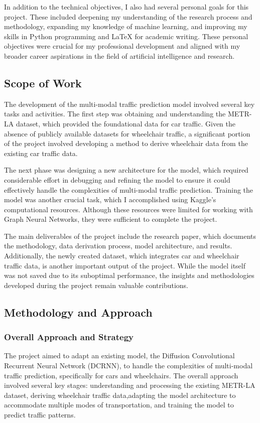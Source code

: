 In addition to the technical objectives, I also had several personal goals for this project.
These included deepening my understanding of the research process and methodology, expanding my knowledge of machine
learning, and improving my skills in Python programming and LaTeX for academic writing.
These personal objectives were crucial for my professional development and aligned with my broader career aspirations in
the field of artificial intelligence and research.

\subsection{Scope of Work}\label{subsec:scope-of-work}
The development of the multi-modal traffic prediction model involved several key tasks and activities.
The first step was obtaining and understanding the METR-LA dataset, which provided the foundational data for car
traffic.
Given the absence of publicly available datasets for wheelchair traffic, a significant portion of the project involved
developing a method to derive wheelchair data from the existing car traffic data.

The next phase was designing a new architecture for the model, which required considerable effort in debugging and
refining the model to ensure it could effectively handle the complexities of multi-modal traffic prediction.
Training the model was another crucial task, which I accomplished using Kaggle's computational resources.
Although these resources were limited for working with Graph Neural Networks, they were sufficient to complete
the project.

The main deliverables of the project include the research paper, which documents the methodology, data derivation
process, model architecture, and results.
Additionally, the newly created dataset, which integrates car and wheelchair traffic data, is another important output
of the project.
While the model itself was not saved due to its suboptimal performance, the insights and methodologies developed during
the project remain valuable contributions.

\subsection{Methodology and Approach}\label{subsec:methodology-and-approach}

\subsubsection{Overall Approach and Strategy}\label{subsubsec:overall-approach-and-strategy}
The project aimed to adapt an existing model, the Diffusion Convolutional Recurrent Neural Network (DCRNN), to handle
the complexities of multi-modal traffic prediction, specifically for cars and wheelchairs.
The overall approach involved several key stages: understanding and processing the existing METR-LA dataset, deriving
wheelchair traffic data,adapting the model architecture to accommodate multiple modes of transportation, and training
the model to predict traffic patterns.

